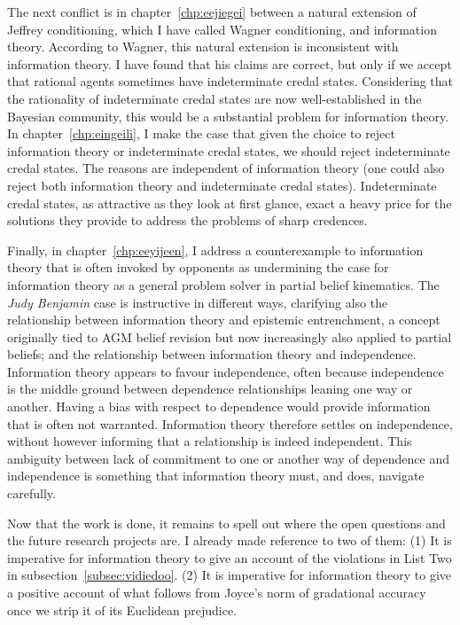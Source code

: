 \documentclass[phd,12pt,oneside]{ubcthesis}
\begin{document}
The next conflict is in chapter~\ref{chp:eejiegei} between a natural
extension of Jeffrey conditioning, which I have called Wagner
conditioning, and information theory. According to Wagner, this
natural extension is inconsistent with information theory. I have
found that his claims are correct, but only if we accept that rational
agents sometimes have indeterminate credal states. Considering that
the rationality of indeterminate credal states are now
well-established in the Bayesian community, this would be a
substantial problem for information theory. In
chapter~\ref{chp:eingeili}, I make the case that given the choice to
reject information theory or indeterminate credal states, we should
reject indeterminate credal states. The reasons are independent of
information theory (one could also reject both information theory and
indeterminate credal states). Indeterminate credal states, as
attractive as they look at first glance, exact a heavy price for the
solutions they provide to address the problems of sharp credences.

Finally, in chapter~\ref{chp:eeyijeen}, I address a counterexample to
information theory that is often invoked by opponents as undermining
the case for information theory as a general problem solver in partial
belief kinematics. The \emph{Judy Benjamin} case is instructive in
different ways, clarifying also the relationship between information
theory and epistemic entrenchment, a concept originally tied to AGM
belief revision but now increasingly also applied to partial beliefs;
and the relationship between information theory and independence.
Information theory appears to favour independence, often because
independence is the middle ground between dependence relationships
leaning one way or another. Having a bias with respect to dependence
would provide information that is often not warranted. Information
theory therefore settles on independence, without however informing
that a relationship is indeed independent. This ambiguity between lack
of commitment to one or another way of dependence and independence is
something that information theory must, and does, navigate carefully.

Now that the work is done, it remains to spell out where the open
questions and the future research projects are. I already made
reference to two of them: (1) It is imperative for information theory
to give an account of the violations in List Two in
subsection~\ref{subsec:vidiedoo}. (2) It is imperative for information
theory to give a positive account of what follows from Joyce's norm of
gradational accuracy once we strip it of its Euclidean prejudice.
\end{document}
